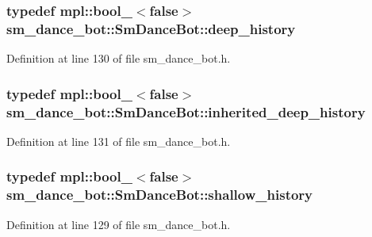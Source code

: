 \subsubsection[{\texorpdfstring{deep\+\_\+history}{deep_history}}]{\setlength{\rightskip}{0pt plus 5cm}typedef mpl\+::bool\+\_\+$<$false$>$ {\bf sm\+\_\+dance\+\_\+bot\+::\+Sm\+Dance\+Bot\+::deep\+\_\+history}}\hypertarget{structsm__dance__bot_1_1SmDanceBot_abd58ec4a2b50a45da304a5f0b9c44706}{}\label{structsm__dance__bot_1_1SmDanceBot_abd58ec4a2b50a45da304a5f0b9c44706}


Definition at line 130 of file sm\+\_\+dance\+\_\+bot.\+h.

\subsubsection[{\texorpdfstring{inherited\+\_\+deep\+\_\+history}{inherited_deep_history}}]{\setlength{\rightskip}{0pt plus 5cm}typedef mpl\+::bool\+\_\+$<$false$>$ {\bf sm\+\_\+dance\+\_\+bot\+::\+Sm\+Dance\+Bot\+::inherited\+\_\+deep\+\_\+history}}\hypertarget{structsm__dance__bot_1_1SmDanceBot_a9bc29171f1a5e3cfd09824a06f6a8058}{}\label{structsm__dance__bot_1_1SmDanceBot_a9bc29171f1a5e3cfd09824a06f6a8058}


Definition at line 131 of file sm\+\_\+dance\+\_\+bot.\+h.

\subsubsection[{\texorpdfstring{shallow\+\_\+history}{shallow_history}}]{\setlength{\rightskip}{0pt plus 5cm}typedef mpl\+::bool\+\_\+$<$false$>$ {\bf sm\+\_\+dance\+\_\+bot\+::\+Sm\+Dance\+Bot\+::shallow\+\_\+history}}\hypertarget{structsm__dance__bot_1_1SmDanceBot_a780b2408077887cc9c888ed0a95bff68}{}\label{structsm__dance__bot_1_1SmDanceBot_a780b2408077887cc9c888ed0a95bff68}


Definition at line 129 of file sm\+\_\+dance\+\_\+bot.\+h.




